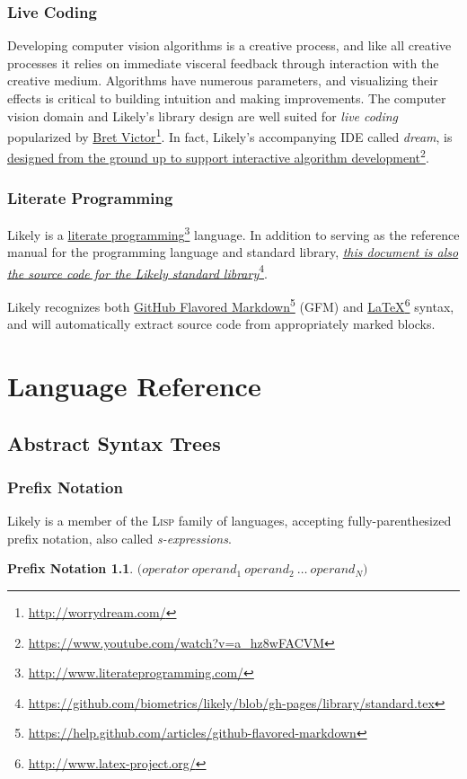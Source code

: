 \documentclass[twoside=false, numbers=noenddot]{scrbook}
\newcommand{\noun}[1]{\textsc{#1}}
\newcommand{\fref}[2]{\href{#1}{#2}\footnote{\href{#1}{#1}}}
\newcommand{\githuburl}{https://github.com/biometrics/likely/}
\begin{document}
\section{Live Coding}
Developing computer vision algorithms is a creative process, and like all creative processes it relies on immediate visceral feedback through interaction with the creative medium.
Algorithms have numerous parameters, and visualizing their effects is critical to building intuition and making improvements.
The computer vision domain and Likely's library design are well suited for \emph{live coding} popularized by \fref{http://worrydream.com/}{Bret Victor}.
In fact, Likely's accompanying IDE called \emph{dream}, is \fref{https://www.youtube.com/watch?v=a\_hz8wFACVM}{designed from the ground up to support interactive algorithm development}.

\section{Literate Programming}
Likely is a \fref{http://www.literateprogramming.com/}{literate programming} language.
In addition to serving as the reference manual for the programming language and standard library, \fref{\githuburl blob/gh-pages/library/standard.tex}{\emph{this document is also the source code for the Likely standard library}}.

Likely recognizes both \fref{https://help.github.com/articles/github-flavored-markdown}{GitHub Flavored Markdown} (GFM) and \fref{http://www.latex-project.org/}{\LaTeX} syntax, and will automatically extract source code from appropriately marked blocks.

\part{Language Reference}
\chapter{Abstract Syntax Trees}
\section{Prefix Notation}
Likely is a member of the \noun{Lisp} family of languages, accepting fully-parenthesized prefix notation, also called \emph{s-expressions}.

\theoremstyle{dotless}
\newtheorem*{PN}{Prefix Notation \nopunct}
\begin{PN}
$\boldsymbol{(} operator\ operand_1\ operand_2\ \dots\ operand_N \boldsymbol{)}$
\end{PN}
\end{document}
